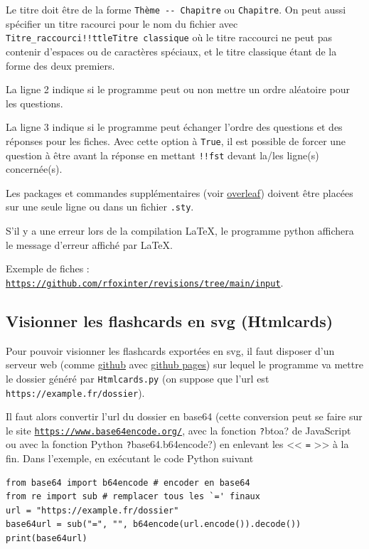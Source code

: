 \documentclass[a4paper,12pt]{article}
\begin{document}
Le titre doit être de la forme \texttt{Thème -{}- Chapitre} ou \texttt{Chapitre}.
On peut aussi spécifier un titre racourci pour le nom du fichier avec \texttt{Titre\_raccourci!!ttleTitre classique} où le titre raccourci ne peut pas contenir d'espaces ou de caractères spéciaux, et le titre classique étant de la forme des deux premiers.

La ligne 2 indique si le programme peut ou non mettre un ordre aléatoire pour les questions.

La ligne 3 indique si le programme peut échanger l'ordre des questions et des réponses pour les fiches. Avec cette option à \texttt{True}, il est possible de forcer une question à être avant la réponse en mettant \texttt{!!fst} devant la/les ligne(s) concernée(s).

Les packages et commandes supplémentaires (voir \href{https://www.overleaf.com/learn/latex/Commands}{overleaf}) doivent être placées sur une seule ligne ou dans un fichier \texttt{.sty}.

S'il y a une erreur lors de la compilation \LaTeX, le programme python affichera le message d'erreur affiché par \LaTeX.

Exemple de fiches : \href{https://github.com/rfoxinter/revisions/tree/main/input}{\texttt{https://github.com/rfoxinter/revisions/tree/main/input}}.
\subsection{Visionner les flashcards en svg (Htmlcards)}
Pour pouvoir visionner les flashcards exportées en svg, il faut disposer d'un serveur web (comme \href{https://github.com/}{github} avec \href{https://pages.github.com/}{github pages}) sur lequel le programme va mettre le dossier généré par \texttt{Htmlcards.py} (on suppose que l'url est \texttt{https://example.fr/dossier}).

Il faut alors convertir l'url du dossier en base64 (cette conversion peut se faire sur le site \href{https://www.base64encode.org/}{\texttt{https://www.base64encode.org/}}, avec la fonction \texttt?btoa? de JavaScript ou avec la  fonction Python \texttt?base64.b64encode?) en enlevant les << \texttt{=} >> à la fin. Dans l'exemple, en exécutant le code Python suivant
\vspace{-\abovedisplayskip}\begin{verbatim}
from base64 import b64encode # encoder en base64
from re import sub # remplacer tous les `=' finaux
url = "https://example.fr/dossier"
base64url = sub("=", "", b64encode(url.encode()).decode())
print(base64url)
\end{verbatim}
\vspace{-\belowdisplayskip}
\end{document}

